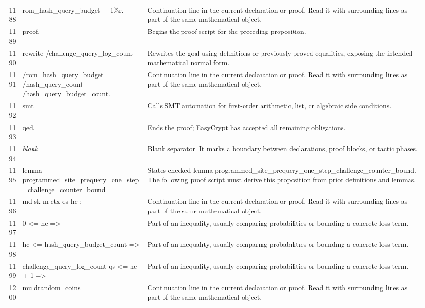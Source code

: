 \documentclass[10pt]{article}
\begin{document}
\begin{longtable}{r L{0.53\textwidth} L{0.37\textwidth}}
1188 & {\ttfamily\scriptsize     rom\_hash\_query\_budget + 1\%r.} & Continuation line in the current declaration or proof.  Read it with surrounding lines as part of the same mathematical object. \\
1189 & {\ttfamily\scriptsize proof.} & Begins the proof script for the preceding proposition. \\
1190 & {\ttfamily\scriptsize rewrite /challenge\_query\_log\_count} & Rewrites the goal using definitions or previously proved equalities, exposing the intended mathematical normal form. \\
1191 & {\ttfamily\scriptsize         /rom\_hash\_query\_budget /hash\_query\_count /hash\_query\_budget\_count.} & Continuation line in the current declaration or proof.  Read it with surrounding lines as part of the same mathematical object. \\
1192 & {\ttfamily\scriptsize smt.} & Calls SMT automation for first-order arithmetic, list, or algebraic side conditions. \\
1193 & {\ttfamily\scriptsize qed.} & Ends the proof; EasyCrypt has accepted all remaining obligations. \\
1194 & {\ttfamily\scriptsize \emph{blank}} & Blank separator.  It marks a boundary between declarations, proof blocks, or tactic phases. \\
1195 & {\ttfamily\scriptsize lemma programmed\_site\_prequery\_one\_step\_challenge\_counter\_bound} & States checked lemma programmed\_site\_prequery\_one\_step\_challenge\_counter\_bound.  The following proof script must derive this proposition from prior definitions and lemmas. \\
1196 & {\ttfamily\scriptsize   md sk m ctx qs hc :} & Continuation line in the current declaration or proof.  Read it with surrounding lines as part of the same mathematical object. \\
1197 & {\ttfamily\scriptsize   0 <= hc =>} & Part of an inequality, usually comparing probabilities or bounding a concrete loss term. \\
1198 & {\ttfamily\scriptsize   hc <= hash\_query\_budget\_count =>} & Part of an inequality, usually comparing probabilities or bounding a concrete loss term. \\
1199 & {\ttfamily\scriptsize   challenge\_query\_log\_count qs <= hc + 1 =>} & Part of an inequality, usually comparing probabilities or bounding a concrete loss term. \\
1200 & {\ttfamily\scriptsize   mu drandom\_coins} & Continuation line in the current declaration or proof.  Read it with surrounding lines as part of the same mathematical object. \\

\end{longtable}
\end{document}
